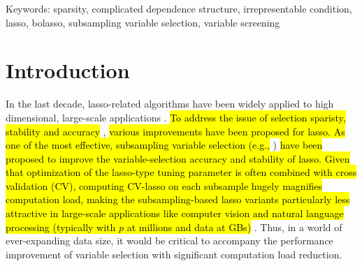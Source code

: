\documentclass[12pt]{article}
\begin{document}
\noindent
\normalsize
Keywords: sparsity, complicated dependence structure, irrepresentable condition, lasso, bolasso, subsampling variable selection, variable screening

\vfill
\newpage
{} 


\clearpage
{}

\section{Introduction}

In the last decade, lasso-related algorithms have been widely applied to high dimensional, large-scale applications \citep{efronall04, friedman2007pathwise, friedman2010regularization}. \hl{To address the issue of selection sparisty, stability and accuracy} \citep{weisberg04, lim2016estimation}, \hl{various improvements have been proposed for lasso. As one of the most effective, subsampling variable selection (e.g.,} \citet{bach2008bolasso, meinshausen2010stability, guo2015improved}) \hl{have been proposed to improve the variable-selection accuracy and stability of lasso. Given that optimization of the lasso-type tuning parameter is often combined with cross validation (CV), computing CV-lasso on each subsample hugely magnifies computation load, making the subsampling-based lasso variants particularly less attractive in large-scale applications like computer vision and natural language processing (typically with $p$ at millions and data at GBs)} \citep{xu2012asymptotic}. Thus, in a world of ever-expanding data size, it would be critical to accompany the performance improvement of variable selection with significant computation load reduction. 
\end{document}
